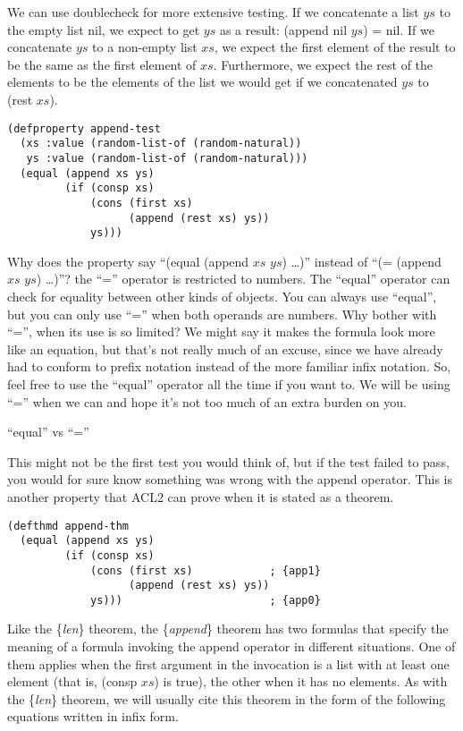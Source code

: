 We can use doublecheck for more extensive testing. If we concatenate a list $ys$ to the empty list nil, we expect to get $ys$ as a result: (append nil $ys$) = nil. If we concatenate $ys$ to a non-empty list $xs$, we expect the first element of the result to be the same as the first element of $xs$. Furthermore, we expect the rest of the elements to be the elements of the list we would get if we concatenated $ys$ to (rest $xs$).

\begin{lstlisting}
(defproperty append-test
  (xs :value (random-list-of (random-natural))
   ys :value (random-list-of (random-natural)))
  (equal (append xs ys)
         (if (consp xs)
             (cons (first xs)
                   (append (rest xs) ys))
             ys)))
\end{lstlisting}

\begin{aside}
Why does the property say ``(equal (append $xs$ $ys$) \dots)'' instead of ``(= (append $xs$ $ys$) \dots)''? the ``='' operator is restricted to numbers. The ``equal'' operator can check for equality between other kinds of objects. You can always use ``equal'', but you can only use ``='' when both operands are numbers. Why bother with ``='', when its use is so limited? We might say it makes the formula look more like an equation, but that's not really much of an excuse, since we have already had to conform to prefix notation instead of the more familiar infix notation. So, feel free to use the ``equal'' operator all the time if you want to. We will be using ``='' when we can and hope it's not too much of an extra burden on you.
\caption{``equal'' vs ``=''}
\label{equal}
\end{aside}

This might not be the first test you would think of, but if the test failed to pass, you would for sure know something was wrong with the append operator. This is another property that ACL2 can prove when it is stated as a theorem.

\begin{lstlisting}
(defthmd append-thm
  (equal (append xs ys)
         (if (consp xs)
             (cons (first xs)            ; {app1}
                   (append (rest xs) ys))
             ys)))                       ; {app0}
\end{lstlisting}


Like the \{\emph{len}\} theorem, the \{\emph{append}\} theorem has two formulas that specify the meaning of a formula invoking the append operator in different situations. One of them applies when the first argument in the invocation is a list with at least one element (that is, (consp $xs$) is true), the other when it has no elements. As with the \{\emph{len}\} theorem, we will usually cite this theorem in the form of the following equations written in infix form.

